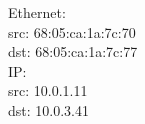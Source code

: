 Ethernet:\\
	src: 68:05:ca:1a:7c:70\\
	dst: 68:05:ca:1a:7c:77\\

IP:\\
	src: 10.0.1.11\\
	dst: 10.0.3.41